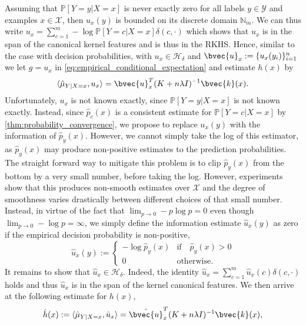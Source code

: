 \documentclass{article}
\begin{document}
		Assuming that $\mathbb{P}[Y = y | X = x]$ is never exactly zero for all labels $y \in \mathcal{Y}$ and examples $x \in \mathcal{X}$, then $u_{x}(y)$ is bounded on its discrete domain $\mathbb{N}_{m}$. We can thus write $u_{x} = \sum_{c = 1}^{m} - \log{\mathbb{P}[Y = c | X = x]} \delta(c, \cdot)$ which shows that $u_{x}$ is in the span of the canonical kernel features and is thus in the RKHS. Hence, similar to the case with decision probabilities, with $u_{x} \in \mathcal{H}_{\delta}$ and $\bvec{u}_{x} := \{u_{x}(y_{i})\}_{i = 1}^{n}$ we let $g = u_{x}$ in \eqref{eq:empirical_conditional_expectation} and estimate $h(x)$ by
		\begin{equation}
			\langle \hat{\mu}_{Y | X = x}, u_{x} \rangle = \bvec{u}_{x}^{T} (K + n \lambda I)^{-1} \bvec{k}(x).
		\end{equation}
		Unfortunately, $u_{x}$ is not known exactly, since $\mathbb{P}[Y = y | X = x]$ is not known exactly. Instead, since $\hat{p}_{c}(x)$ is a consistent estimate for $\mathbb{P}[Y = c | X = x]$ by \cref{thm:probability_convergence}, we propose to replace $u_{x}(y)$ with the information of $\hat{p}_{y}(x)$. However, we cannot simply take the log of this estimator, as $\hat{p}_{y}(x)$ may produce non-positive estimates to the prediction probabilities. The straight forward way to mitigate this problem is to clip $\hat{p}_{y}(x)$ from the bottom by a very small number, before taking the log. However, experiments show that this produces non-smooth estimates over $\mathcal{X}$ and the degree of smoothness varies drastically between different choices of that small number. Instead, in virtue of the fact that $\lim_{p \to 0} - p \log{p} = 0$ even though $\lim_{p \to 0} - \log{p} = \infty$, we simply define the information estimate $\hat{u}_{x}(y)$ as zero if the empirical decision probability is non-positive,
		\begin{equation}
			\hat{u}_{x}(y) := \begin{cases}
				- \log{\hat{p}_{y}(x)} & \mathrm{if } \quad \hat{p}_{y}(x) > 0 \\
				0 & \mathrm{otherwise}. \end{cases}
			\label{eq:empirical_information}
		\end{equation}
		It remains to show that $\hat{u}_{x} \in \mathcal{H}_{\delta}$. Indeed, the identity $\hat{u}_{x} = \sum_{c = 1}^{m} \hat{u}_{x}(c) \delta(c, \cdot)$ holds and thus $\hat{u}_{x}$ is in the span of the kernel canonical features. We then arrive at the following estimate for $h(x)$,
		\begin{equation}
			\hat{h}(x) := \langle \hat{\mu}_{Y | X = x}, \hat{u}_{x} \rangle = \hat{\bvec{u}}_{x}^{T} (K + n \lambda I)^{-1} \bvec{k}(x),
		\label{eq:empirical_information_entropy}
		\end{equation}
\end{document}
